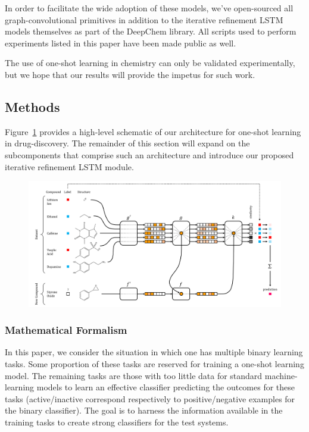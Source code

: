 In order to facilitate the wide adoption of these models, we've open-sourced all graph-convolutional primitives in addition to the iterative refinement LSTM models themselves as part of the DeepChem library. All scripts used to perform experiments listed in this paper have been made public as well.

The use of one-shot learning in chemistry can only be validated experimentally, but we hope that our results will provide the impetus for such work.


\subsection{Methods}
Figure~\ref{fig:schematic} provides a high-level schematic of our architecture for one-shot learning in drug-discovery. The remainder of this section will expand on the subcomponents that comprise such an architecture and introduce our proposed iterative refinement LSTM module.

\begin{figure}[h]
\includegraphics[width=\textwidth]{Images/schematic_v2.png}
\label{fig:schematic}
\end{figure}

\subsubsection{Mathematical Formalism}

In this paper, we consider the situation in which one has multiple binary learning tasks. Some proportion of these tasks are reserved for training a one-shot learning model. The remaining tasks are those with too little data for standard machine-learning models to learn an effective classifier predicting the outcomes for these tasks (active/inactive correspond respectively to positive/negative examples for the binary classifier). The goal is to harness the information available in the training tasks to create strong classifiers for the test systems. 

